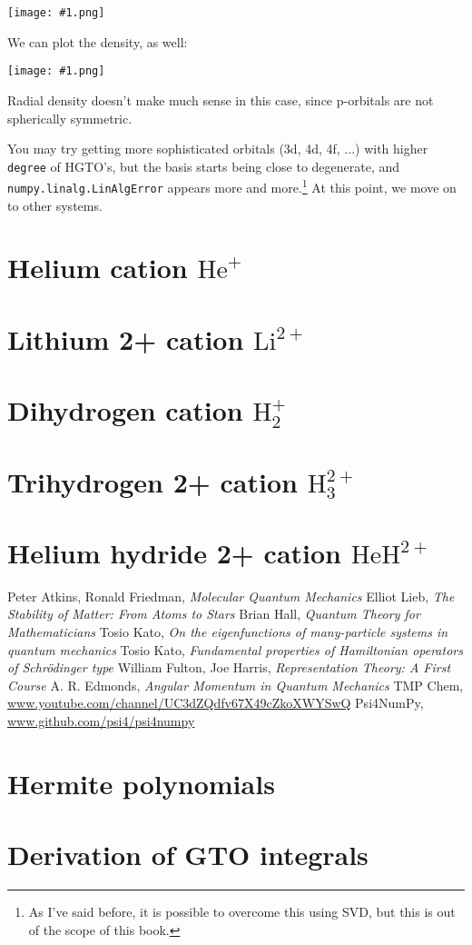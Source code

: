 \documentclass{article}
\newcommand{\molecule}[1]{\textrm{#1}}
\newcommand{\image}[1]{
\begin{center}
\texttt{[image: \#1.png]}
\end{center}
}
\begin{document}
\image{hydrogen-wavefunction-p-3}

We can plot the density, as well:

\image{hydrogen-density-p-3}

Radial density doesn't make much sense in this case, since p-orbitals are not spherically symmetric.

You may try getting more sophisticated orbitals (3d, 4d, 4f, ...) with higher \texttt{degree} of HGTO's, but the basis starts being close to degenerate, and \texttt{numpy.linalg.LinAlgError} appears more and more.\footnote{As I've said before, it is possible to overcome this using SVD, but this is out of the scope of this book.} At this point, we move on to other systems.

\section{Helium cation \(\molecule{He}^+\)} 
\section{Lithium 2+ cation \(\molecule{Li}^{2+}\)}
\section{Dihydrogen cation \(\molecule{H}_2^+\)}
\section{Trihydrogen 2+ cation \(\molecule{H}_3^{2+}\)}
\section{Helium hydride 2+ cation \(\molecule{HeH}^{2+}\)}

\begin{thebibliography}{9}
	Peter Atkins, Ronald Friedman,
	\textit{Molecular Quantum Mechanics}
	Elliot Lieb,
	\textit{The Stability of Matter: From Atoms to Stars}
	Brian Hall,
	\textit{Quantum Theory for Mathematicians}
	Tosio Kato,
	\textit{On the eigenfunctions of many-particle systems in quantum mechanics}
	Tosio Kato,
	\textit{Fundamental properties of Hamiltonian operators of Schrödinger type}
	William Fulton, Joe Harris,
	\textit{Representation Theory: A First Course}
	A. R. Edmonds,
	\textit{Angular Momentum in Quantum Mechanics}
	TMP Chem,
	\url{www.youtube.com/channel/UC3dZQdfv67X49cZkoXWYSwQ}
	Psi4NumPy,
	\url{www.github.com/psi4/psi4numpy}
\end{thebibliography}

\begin{appendices}
\section{Hermite polynomials} \label{apx:hermite}
\section{Derivation of GTO integrals} \label{apx:integrals}
\end{appendices}
\end{document}
